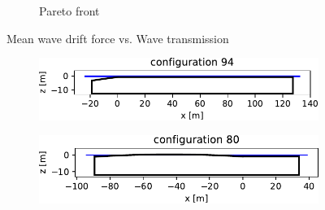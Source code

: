 \begin{figure}[h]
\begin{subfigure}[b]{0.49\textwidth}
        \caption[]%
        {{\small Pareto front}}    
        \label{fig: Fd vs. Kt DI2 H3 captive pareto}
    \end{subfigure}
    
    \caption{Mean wave drift force vs. Wave transmission}
    \label{fig: Fd vs. Kt DI2 H3 captive}
\end{figure}



\begin{figure}[h]
    \centering
    \begin{subfigure}[b]{0.49\textwidth}
        \centering
        \includegraphics[width=\linewidth]{figures/ComFLOW/Breakwater Geometries/Design Iteration 2 captive/breakwater_geometry94.pdf}
        \caption[]%
        {{\small }}    
        \label{}
    \end{subfigure}
    \hfill
    \begin{subfigure}[b]{0.49\textwidth}  
        \centering 
        \includegraphics[width=\linewidth]{figures/ComFLOW/Breakwater Geometries/Design Iteration 2 captive/breakwater_geometry80.pdf}    
        {{\small }}    
        \label{}
    \end{subfigure}
    

\end{figure}
